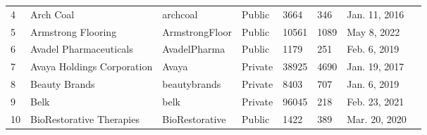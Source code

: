 \documentclass[9pt,twoside,lineno]{pnas-new}
\begin{document}
\begin{longtable}{llllllll}
4           & Arch Coal                                                                       & archcoal                                                            & Public           & 3664               & 346             & Jan. 11, 2016                                                                                                                      \\
5           & Armstrong Flooring                                                              & ArmstrongFloor                                                      & Public           & 10561              & 1089               & May 8, 2022                                                                                                                           \\
6           & Avadel Pharmaceuticals                                                          & AvadelPharma                                                        & Public           & 1179               & 251                & Feb. 6, 2019                                                                                                                      \\
7           & Avaya Holdings Corporation                                                      & Avaya                                                               & Private          & 38925              & 4690               & Jan. 19, 2017                                                                                                                      \\
8           & Beauty Brands                                                                   & beautybrands                                                        & Private          & 8403               & 707                & Jan. 6, 2019                                                                                                                       \\
9           & Belk                                                                            & belk                                                                & Private          & 96045              & 218                & Feb. 23, 2021                                                                                                                     \\
10          & BioRestorative Therapies                                                  & BioRestorative                                                      & Public           & 1422               & 389                & Mar. 20, 2020                                                                                                                        \\

\end{longtable}
\end{document}
